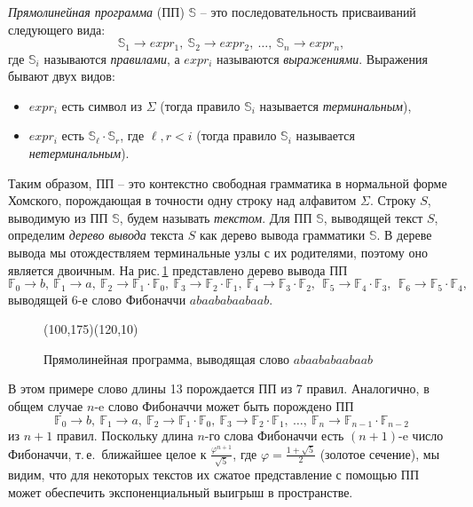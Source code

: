 ﻿\documentclass[11pt]{article}
\theoremstyle{remark}
\newcommand{\slp}[1]{\mathbb{#1}}
\begin{document}
\emph{Прямолинейная программа} (ПП) $\slp{S}$ -- это последовательность присваиваний следующего вида:
$$\slp{S}_1 \to expr_1,\ \slp{S}_2\to expr_2,\ \dots,\ \slp{S}_n \to expr_n,$$
где $\slp{S}_i$ называются \emph{правилами}, а $expr_i$ называются \emph{выражениями}. Выражения бывают двух видов:
\begin{itemize}
\item $expr_i$ есть символ из $\Sigma$ (тогда правило $\slp{S}_i$ называется \emph{терминальным}),
\item $expr_i$ есть $\slp{S}_\ell \cdot \slp{S}_r$, где $\ell,r < i$ (тогда правило $\slp{S}_i$ называется \emph{нетерминальным}).
\end{itemize}

Таким образом, ПП -- это контекстно свободная грамматика в нормальной форме Хомского, порождающая в точности одну строку над алфавитом
$\Sigma$. Строку $S$, выводимую из ПП $\slp{S}$, будем называть \emph{текстом}. Для ПП $\slp{S}$, выводящей текст $S$, определим
\emph{дерево вывода} текста $S$ как дерево вывода грамматики $\slp{S}$. В дереве вывода мы отождествляем терминальные узлы с их родителями,
поэтому оно является двоичным. На рис.\,\ref{fibonacci_word_slp} представлено дерево вывода ПП $$ \slp{F}_0{\to} b,\ \slp{F}_1{\to} a,\
\slp{F}_2{\to} \slp{F}_1\cdot\slp{F}_0,\ \slp{F}_3{\to} \slp{F}_2\cdot\slp{F}_1,\ \slp{F}_4{\to} \slp{F}_3\cdot\slp{F}_2,\ \ \slp{F}_5{\to}
\slp{F}_4\cdot\slp{F}_3,\ \ \slp{F}_6{\to} \slp{F}_5\cdot\slp{F}_4,$$ выводящей 6-е слово Фибоначчи $abaababaabaab$.
\begin{figure}[hb]
    \begin{center}
        \begin{picture}(100,175)(120,10)
            \fibonacciwordslp
        \end{picture}
    \end{center}
    \caption{Прямолинейная программа, выводящая слово $abaababaabaab$}
    \label{fibonacci_word_slp}
\end{figure}
В этом примере слово длины 13 порождается  ПП из 7 правил. Аналогично, в общем случае $n$-e слово Фибоначчи может быть порождено ПП
$$\slp{F}_0\to b,\ \slp{F}_1\to a,\ \slp{F}_2\to \slp{F}_1\cdot\slp{F}_0,\ \slp{F}_3\to \slp{F}_2\cdot\slp{F}_1,\ \dots,\
\slp{F}_n\to \slp{F}_{n-1}\cdot\slp{F}_{n-2}$$ из $n+1$ правил. Поскольку длина $n$-го слова Фибоначчи есть $(n+1)$-e число Фибоначчи,
т.\,е.\ ближайшее целое к $\frac{\varphi^{n+1}}{\sqrt{5}}$, где $\varphi=\frac{1+\sqrt{5}}2$ (золотое сечение), мы видим, что для некоторых
текстов их сжатое представление с помощью ПП может обеспечить экспоненциальный выигрыш в пространстве.
\end{document}
